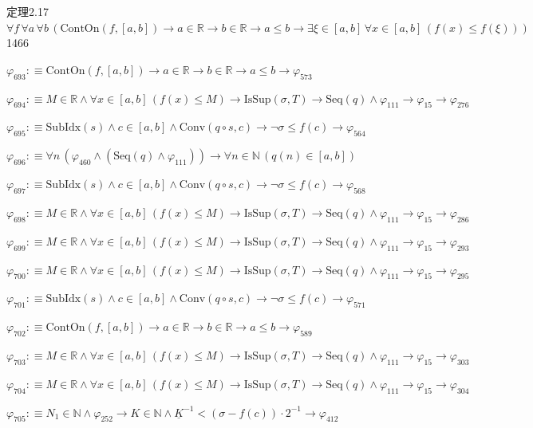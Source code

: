 \begin{fullproof}{定理2.17}{$\forall f\,\forall a\,\forall b\,(\mathrm{ContOn}(f,[a,b]) \to a \in \mathbb{R} \to b \in \mathbb{R} \to a \leq b \to \exists \xi \in [a,b]\,\forall x \in [a,b]\,(f(x) \leq f(\xi)))$}{1466}
\begin{abbrevlist}
\item $\varphi_{693} :\equiv \mathrm{ContOn}(f,[a,b]) \to a \in \mathbb{R} \to b \in \mathbb{R} \to a \leq b \to \varphi_{573}$
\item $\varphi_{694} :\equiv M \in \mathbb{R} \land \forall x \in [a,b]\,(f(x) \leq M) \to \mathrm{IsSup}(\sigma,T) \to \mathrm{Seq}(q) \land \varphi_{111} \to \varphi_{15} \to \varphi_{276}$
\item $\varphi_{695} :\equiv \mathrm{SubIdx}(s) \land c \in [a,b] \land \mathrm{Conv}(q \circ s,c) \to \neg \sigma \leq f(c) \to \varphi_{564}$
\item $\varphi_{696} :\equiv \forall n\,(\varphi_{460} \land (\mathrm{Seq}(q) \land \varphi_{111})) \to \forall n \in \mathbb{N}\,(q(n) \in [a,b])$
\item $\varphi_{697} :\equiv \mathrm{SubIdx}(s) \land c \in [a,b] \land \mathrm{Conv}(q \circ s,c) \to \neg \sigma \leq f(c) \to \varphi_{568}$
\item $\varphi_{698} :\equiv M \in \mathbb{R} \land \forall x \in [a,b]\,(f(x) \leq M) \to \mathrm{IsSup}(\sigma,T) \to \mathrm{Seq}(q) \land \varphi_{111} \to \varphi_{15} \to \varphi_{286}$
\item $\varphi_{699} :\equiv M \in \mathbb{R} \land \forall x \in [a,b]\,(f(x) \leq M) \to \mathrm{IsSup}(\sigma,T) \to \mathrm{Seq}(q) \land \varphi_{111} \to \varphi_{15} \to \varphi_{293}$
\item $\varphi_{700} :\equiv M \in \mathbb{R} \land \forall x \in [a,b]\,(f(x) \leq M) \to \mathrm{IsSup}(\sigma,T) \to \mathrm{Seq}(q) \land \varphi_{111} \to \varphi_{15} \to \varphi_{295}$
\item $\varphi_{701} :\equiv \mathrm{SubIdx}(s) \land c \in [a,b] \land \mathrm{Conv}(q \circ s,c) \to \neg \sigma \leq f(c) \to \varphi_{571}$
\item $\varphi_{702} :\equiv \mathrm{ContOn}(f,[a,b]) \to a \in \mathbb{R} \to b \in \mathbb{R} \to a \leq b \to \varphi_{589}$
\item $\varphi_{703} :\equiv M \in \mathbb{R} \land \forall x \in [a,b]\,(f(x) \leq M) \to \mathrm{IsSup}(\sigma,T) \to \mathrm{Seq}(q) \land \varphi_{111} \to \varphi_{15} \to \varphi_{303}$
\item $\varphi_{704} :\equiv M \in \mathbb{R} \land \forall x \in [a,b]\,(f(x) \leq M) \to \mathrm{IsSup}(\sigma,T) \to \mathrm{Seq}(q) \land \varphi_{111} \to \varphi_{15} \to \varphi_{304}$
\item $\varphi_{705} :\equiv N_{1} \in \mathbb{N} \land \varphi_{252} \to K \in \mathbb{N} \land \underline{K}^{-1} < (\sigma - f(c)) \cdot 2^{-1} \to \varphi_{412}$

\end{abbrevlist}
\end{fullproof}
